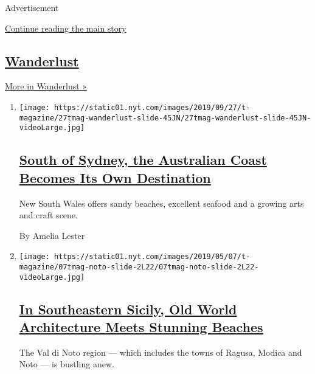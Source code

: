 Advertisement

\protect\hyperlink{after-mid1}{Continue reading the main story}

\hypertarget{wanderlust-1}{%
\subsection{\texorpdfstring{\href{/column/wanderlust}{Wanderlust}}{Wanderlust}}\label{wanderlust-1}}

\href{/column/wanderlust}{More in Wanderlust »}

\begin{enumerate}
\def\labelenumi{\arabic{enumi}.}
\item
  \texttt{[image: https://static01.nyt.com/images/2019/09/27/t-magazine/27tmag-wanderlust-slide-45JN/27tmag-wanderlust-slide-45JN-videoLarge.jpg]}

  \hypertarget{south-of-sydney-the-australian-coast-becomes-its-own-destination}{%
  \subsection{\texorpdfstring{\href{/2019/09/27/t-magazine/new-south-wales-travel.html}{South
  of Sydney, the Australian Coast Becomes Its Own
  Destination}}{South of Sydney, the Australian Coast Becomes Its Own Destination}}\label{south-of-sydney-the-australian-coast-becomes-its-own-destination}}

  New South Wales offers sandy beaches, excellent seafood and a growing
  arts and craft scene.

  By Amelia Lester
\item
  \texttt{[image: https://static01.nyt.com/images/2019/05/07/t-magazine/07tmag-noto-slide-2L22/07tmag-noto-slide-2L22-videoLarge.jpg]}

  \hypertarget{in-southeastern-sicily-old-world-architecture-meets-stunning-beaches}{%
  \subsection{\texorpdfstring{\href{/2019/05/06/t-magazine/val-di-noto-sicily-travel-guide.html}{In
  Southeastern Sicily, Old World Architecture Meets Stunning
  Beaches}}{In Southeastern Sicily, Old World Architecture Meets Stunning Beaches}}\label{in-southeastern-sicily-old-world-architecture-meets-stunning-beaches}}

  The Val di Noto region --- which includes the towns of Ragusa, Modica
  and Noto --- is bustling anew.


\end{enumerate}
